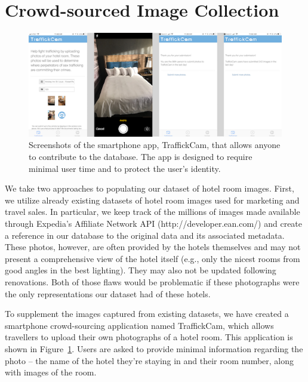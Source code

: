 \section{Crowd-sourced Image Collection}
\begin{figure}[ht!]
  \begin{center}
    \includegraphics[width=\textwidth]{figures/chapter3/appScreenshots.png}
  \end{center}
  \caption[Smartphone app screenshots.]{Screenshots of the smartphone app, TraffickCam, that allows anyone to contribute to the database. The app is designed to require minimal user time and to protect the user's identity.}
  \label{fig:appScreenshots}
\end{figure}

We take two approaches to populating our dataset of hotel room images. First, we utilize already existing datasets of hotel room images used for marketing and travel sales. In particular, we keep track of the millions of images made available through
Expedia’s Affiliate Network API (http://developer.ean.com/) and create a reference in our database to the original data and its associated metadata. These photos, however, are often provided by the hotels themselves and may not present a comprehensive view of the hotel itself (e.g., only the nicest rooms from good angles in the best lighting). They may also
not be updated following renovations. Both of those flaws would be problematic if these photographs were the only representations our dataset had of these hotels. 

To supplement the images captured from existing datasets, we have created a smartphone crowd-sourcing application named TraffickCam, which allows travellers to upload their own photographs of a hotel room. This application is shown in Figure~\ref{fig:appScreenshots}. Users are asked to provide minimal information regarding the photo -- the name of the hotel they're staying in and their room number, along with images of the room.


